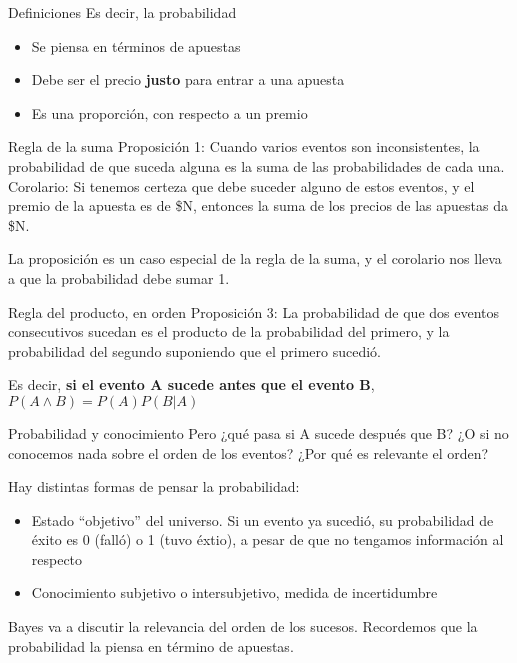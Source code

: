 \documentclass{beamer}
\begin{document}
\begin{frame}{Definiciones}
	Es decir, la probabilidad
	\begin{itemize}
		\item Se piensa en términos de apuestas
		\item Debe ser el precio \textbf{justo} para entrar a una apuesta
		\item Es una proporción, con respecto a un premio
	\end{itemize}
\end{frame}

\begin{frame}{Regla de la suma}
	Proposición 1: Cuando varios eventos son inconsistentes, la probabilidad de que suceda alguna es la suma de las probabilidades de cada una.
	Corolario: Si tenemos certeza que debe suceder alguno de estos eventos, y el premio de la apuesta es de \$N, entonces la suma de los precios de las apuestas da \$N.

	La proposición es un caso especial de la regla de la suma, y el corolario nos lleva a que la probabilidad debe sumar 1.
\end{frame}

\begin{frame}{Regla del producto, en orden}
	Proposición 3: La probabilidad de que dos eventos consecutivos sucedan es el producto de la probabilidad del primero, y la probabilidad del segundo suponiendo que el primero sucedió.

	Es decir, \textbf{si el evento A sucede antes que el evento B}, $P(A \land B) = P(A) P(B|A)$
\end{frame}

\begin{frame}{Probabilidad y conocimiento}
	Pero ¿qué pasa si A sucede después que B? ¿O si no conocemos nada sobre el orden de los eventos? ¿Por qué es relevante el orden?\pause

	Hay distintas formas de pensar la probabilidad:
	\begin{itemize}
		\item Estado ``objetivo'' del universo. Si un evento ya sucedió, su probabilidad de éxito es 0 (falló) o 1 (tuvo éxtio), a pesar de que no tengamos información al respecto
		\item Conocimiento subjetivo o intersubjetivo, medida de incertidumbre
	\end{itemize}
	\pause

	Bayes va a discutir la relevancia del orden de los sucesos.
	Recordemos que la probabilidad la piensa en término de apuestas.
\end{frame}
\end{document}
